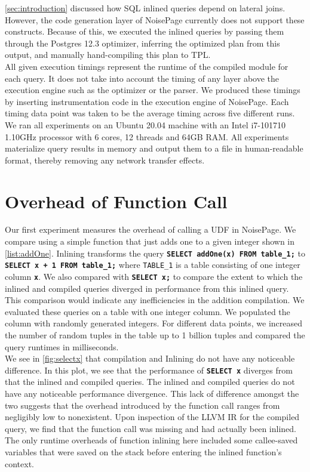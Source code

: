 \documentclass[12pt]{cmuthesis}
\newcommand{\sysname}{NoisePage\xspace}
\newcommand{\dbSQL}[1]{\texttt{\textbf{#1}}\xspace}
\newcommand{\dbTable}[1]{\texttt{\MakeUppercase{#1}}\xspace}
\begin{document}
\cref{sec:introduction} discussed how SQL inlined queries depend on lateral joins. However, the code generation layer of \sysname currently does not support these constructs. Because of this, we executed the inlined queries by passing them through the Postgres 12.3 optimizer, inferring the optimized plan from this output, and manually hand-compiling this plan to TPL.\\

All given execution timings represent the runtime of the compiled module for each query. It does not take into account the timing of any layer above the execution engine such as the optimizer or the parser. We produced these timings by inserting instrumentation code in the execution engine of \sysname. Each timing data point was taken to be the average timing across five different runs.\\

We ran all experiments on an Ubuntu 20.04 machine with an Intel i7-101710 1.10GHz processor with 6 cores, 12 threads and 64GB RAM. All experiments materialize query results in memory and output them to a file in human-readable format, thereby removing any network transfer effects.\\

\section{Overhead of Function Call}

Our first experiment measures the overhead of calling a UDF in \sysname. We compare using a simple function that just adds one to a given integer shown in \cref{list:addOne}. Inlining transforms the query \dbSQL{SELECT addOne(x) FROM table\_1;} to \dbSQL{SELECT x + 1 FROM table\_1;} where \dbTable{table\_1} is a table consisting of one integer column \dbSQL{x}. We also compared with \dbSQL{SELECT x;} to compare the extent to which the inlined and compiled queries diverged in performance from this inlined query. This comparison would indicate any inefficiencies in the addition compilation. We evaluated these queries on a table with one integer column. We populated the column with randomly generated integers. For different data points, we increased the number of random tuples in the table up to 1 billion tuples and compared the query runtimes in milliseconds.\\

We see in \cref{fig:selectx} that compilation and Inlining do not have any noticeable difference. In this plot, we see that the performance of \dbSQL{SELECT x} diverges from that the inlined and compiled queries. The inlined and compiled queries do not have any noticeable performance divergence. This lack of difference amongst the two suggests that the overhead introduced by the function call ranges from negligibly low to nonexistent. Upon inspection of the LLVM IR for the compiled query, we find that the function call was missing and had actually been inlined. The only runtime overheads of function inlining here included some callee-saved variables that were saved on the stack before entering the inlined function’s context.\\
\end{document}
